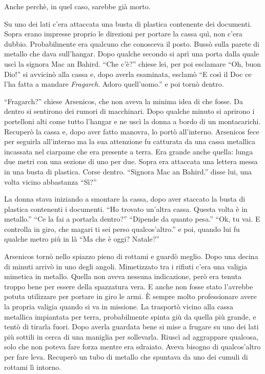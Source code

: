     Anche perchè, in quel caso, sarebbe già morto.

    Su uno dei lati c'era attaccata una busta di plastica contenente dei documenti. Sopra erano impresse proprio le
    direzioni per portare la cassa quì, non c'era dubbio. Probabilmente era qualcuno che conosceva il posto. Bussò sulla
    parete di metallo che dava sull'hangar. Dopo qualche secondo si aprì una porta dalla quale uscì la signora Mac an
    Bahird. ``Che c'è?'' chiese lei, per poi esclamare ``Oh, buon Dio!'' si avvicinò alla cassa e, dopo averla
    esaminata, esclamò ``E così il Doc ce l'ha fatta a mandare \emph{Fragarch}. Adoro quell'uomo.'' e poi tornò dentro.

    ``Fragarch?'' chiese Arsenicos, che non aveva la minima idea di che fosse. Da dentro si sentirono dei rumori di
    macchinari. Dopo qualche minuto si aprirono i portelloni alti come tutto l'hangar e ne uscì la donna a bordo di un
    montacarichi. Recuperò la cassa e, dopo aver fatto manovra, lo portò all'interno. Arsenicos fece per seguirla
    all'interno ma la sua attenzione fu catturata da una cassa metallica incassata nel ciarpame che era presente a
    terra. Era grande anche quella: lunga due metri con una sezione di uno per due. Sopra era attaccata una lettera
    messa in una busta di plastica. Corse dentro. ``Signora Mac an Bahird.'' disse lui, una volta vicino abbastanza
    ``Sì?''

    La donna stava iniziando a smontare la cassa, dopo aver staccato la busta di plastica contenenti i documenti. ``Ho
    trovato un'altra cassa. Questa volta è in metallo.'' ``Ce la fai a portarla dentro?'' ``Dipende da quanto pesa.''
    ``Ok, tu vai. E controlla in giro, che magari ti sei perso qualcos'altro.'' e poi, quando lui fu qualche metro più
    in là ``Ma che è oggi? Natale?''
    
    Arsenicos tornò nello spiazzo pieno di rottami e guardò meglio. Dopo una decina di minuti arrivò in uno degli
    angoli. Mimetizzato tra i rifiuti c'era una valigia mimetica in metallo. Quella non aveva nessuna indicazione, però
    era tenuta troppo bene per essere della spazzatura vera. E anche non fosse stato l'avrebbe potuta utilizzare per
    portare in giro le armi. È sempre molto professionare avere la propria valigia quando si va in missione. La
    trasportò vicino alla cassa metallica impiantata per terra, probabilmente spinta giù da quella più grande, e tentò
    di tirarla fuori. Dopo averla guardata bene si mise a frugare su uno dei lati più sottili in cerca di una maniglia
    per sollevarla. Riuscì ad aggrappare qualcosa, solo che non poteva fare forza mentre era sdraiato. Aveva bisogno di
    qualcos'altro per fare leva. Recuperò un tubo di metallo che spuntava da uno dei cumuli di rottami lì intorno.

